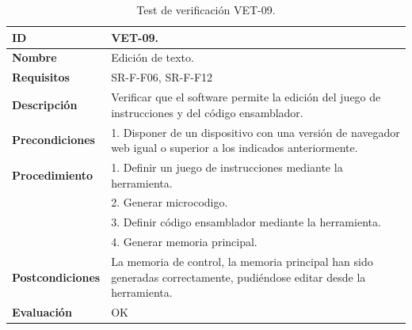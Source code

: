 \begin{center}
\begin{table}[htbp]
\centering
\caption{Test de verificación VET-09.}
\begin{tabular}{@{}p{2.5cm} p{13cm}@{}} 
\toprule
\textbf{ID} 					& VET-09. \\
\midrule
\textbf{Nombre} 				& Edición de texto. \\
\midrule
\textbf{Requisitos} 		& SR-F-F06, SR-F-F12\\
\midrule
\textbf{Descripción} 		& Verificar que el \gls{software} permite la edición del juego de instrucciones y del código \gls{ensamblador}. \\
\midrule
\textbf{Precondiciones}		& 1. Disponer de un dispositivo con una versión de navegador web igual o superior a los indicados anteriormente. \\
\midrule
\textbf{Procedimiento}		& 1. Definir un juego de instrucciones mediante la herramienta.\\
											& 2. Generar \gls{microcodigo}.\\
											& 3. Definir código \gls{ensamblador} mediante la herramienta.\\
											& 4. Generar memoria principal.\\
\midrule
\textbf{Postcondiciones} 		&  La memoria de control, la memoria principal  han sido generadas correctamente, pudiéndose editar desde la herramienta.\\
\midrule
\textbf{Evaluación} 			& OK \\
\bottomrule
\end{tabular}
\label{tab:vet09}
\end{table}
\end{center}

